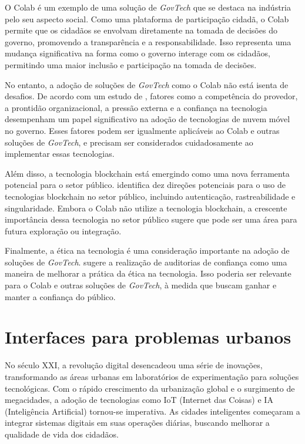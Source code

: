 O Colab é um exemplo de uma solução de \textit{GovTech} que se destaca na indústria pelo seu aspecto social. Como uma plataforma de participação cidadã, o Colab permite que os cidadãos se envolvam diretamente na tomada de decisões do governo, promovendo a transparência e a responsabilidade. Isso representa uma mudança significativa na forma como o governo interage com os cidadãos, permitindo uma maior inclusão e participação na tomada de decisões.

No entanto, a adoção de soluções de \textit{GovTech} como o Colab não está isenta de desafios. De acordo com um estudo de , fatores como a competência do provedor, a prontidão organizacional, a pressão externa e a confiança na tecnologia desempenham um papel significativo na adoção de tecnologias de nuvem móvel no governo. Esses fatores podem ser igualmente aplicáveis ao Colab e outras soluções de \textit{GovTech}, e precisam ser considerados cuidadosamente ao implementar essas tecnologias.

Além disso, a tecnologia blockchain está emergindo como uma nova ferramenta potencial para o setor público.  identifica dez direções potenciais para o uso de tecnologias blockchain no setor público, incluindo autenticação, rastreabilidade e singularidade. Embora o Colab não utilize a tecnologia blockchain, a crescente importância dessa tecnologia no setor público sugere que pode ser uma área para futura exploração ou integração.

Finalmente, a ética na tecnologia é uma consideração importante na adoção de soluções de \textit{GovTech}.  sugere a realização de auditorias de confiança como uma maneira de melhorar a prática da ética na tecnologia. Isso poderia ser relevante para o Colab e outras soluções de \textit{GovTech}, à medida que buscam ganhar e manter a confiança do público.

\section{Interfaces para problemas urbanos}

No século XXI, a revolução digital desencadeou uma série de inovações, transformando as áreas urbanas em laboratórios de experimentação para soluções tecnológicas. Com o rápido crescimento da urbanização global e o surgimento de megacidades, a adoção de tecnologias como IoT (Internet das Coisas) e IA (Inteligência Artificial) tornou-se imperativa. As cidades inteligentes começaram a integrar sistemas digitais em suas operações diárias, buscando melhorar a qualidade de vida dos cidadãos.


